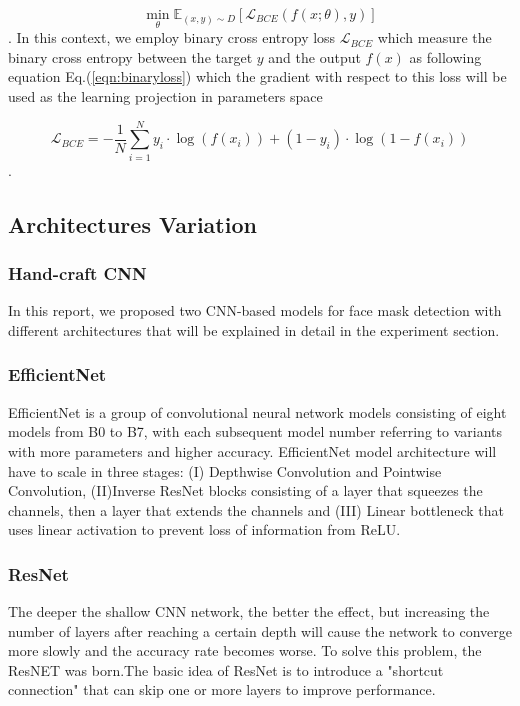 \documentclass[conference]{IEEEtran}
\begin{document}
\begin{equation}
    \min_{\theta} \mathbb{E}_{\left ( x,y \right ) \sim  D} \left [ \mathcal{L}_{BCE} \left ( f(x;\theta), y \right ) \right ]
\end{equation}
. In this context, we employ binary cross entropy loss $\mathcal{L}_{BCE}$ which measure the binary cross entropy between the target $y$ and the output $f(x)$ as following equation
Eq.(\ref{eqn:binaryloss}) which the gradient with respect to this loss will be used as the learning projection in parameters space 

\begin{equation}
\label{eqn:binaryloss}
\mathcal{L}_{BCE}=-\frac{1}{N} \sum_{i=1}^{N} y_{i} \cdot \log \left(f\left(x_{i}\right)\right)+\left(1-y_{i}\right) \cdot \log \left(1-f\left(x_{i}\right)\right)
\end{equation}.

\subsection{Architectures Variation}

\subsubsection{Hand-craft CNN}
In this report, we proposed two CNN-based models for face mask detection with different architectures that will be explained in detail in the experiment section.

\subsubsection{EfficientNet}
EfficientNet is a group of convolutional neural network models consisting of eight models from B0 to B7, with each subsequent model number referring to variants with more parameters and higher accuracy. EfficientNet model architecture will have to scale in three stages: (I) Depthwise Convolution and Pointwise Convolution, (II)Inverse ResNet blocks consisting of a layer that squeezes the channels, then a layer that extends the channels and (III) Linear bottleneck that uses linear activation to prevent loss of information from ReLU.\cite{DBLP:journals/corr/abs-1905-11946}

\subsubsection{ResNet}
The deeper the shallow CNN network, the better the effect, but increasing the number of layers after reaching a certain depth will cause the network to converge more slowly and the accuracy rate becomes worse. To solve this problem, the ResNET was born.The basic idea of ResNet is to introduce a "shortcut connection" that can skip one or more layers to improve performance.
\end{document}
